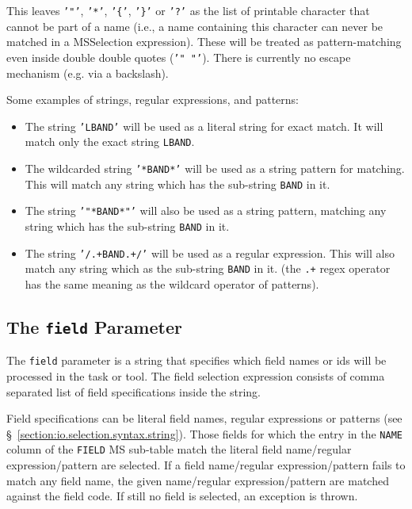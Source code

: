 This leaves  
{\tt '"'}, {\tt '*'}, {\tt'\{'}, {\tt '\}'} or {\tt '?'}
as the list of printable character that cannot be part of a name
(i.e., a name containing this character can never be matched in a
MSSelection expression).  These will be treated as pattern-matching
even inside double double quotes ({\tt '" "'}).
There is currently no escape mechanism (e.g. via a backslash).

Some examples of strings, regular expressions, and patterns:
\begin{itemize}

\item The string {\tt 'LBAND'} will be used as a literal string for
      exact match.  It will match only the exact string {\tt LBAND}.

\item The wildcarded string {\tt '*BAND*'} will be used as a string pattern 
      for matching. This will match any string which has the
      sub-string {\tt BAND} in it. 

\item The string {\tt '"*BAND*"'} will also be used as a string
      pattern, matching any string which has the sub-string {\tt BAND} in it. 

\item The string {\tt '/.+BAND.+/'} will be used as a regular
      expression. This will also match any string which as the 
      sub-string {\tt BAND} in it. (the {\tt .+} regex operator 
      has the same meaning as the {\tt *} wildcard operator of patterns). 

\end{itemize}

\subsection{The {\tt field} Parameter}
\label{section:io.selection.field}

The {\tt field} parameter is a string that specifies which field
names or ids will be processed in the task or tool.
The field selection expression consists of comma separated list of
field specifications inside the string.

Field specifications can be literal field names, regular expressions
or patterns (see \S~\ref{section:io.selection.syntax.string}).  
Those fields for which the entry in the {\tt NAME} column of
the {\tt FIELD} MS sub-table match the literal field name/regular
expression/pattern are selected.
If a field name/regular expression/pattern fails to match any field
name, the given name/regular expression/pattern are matched against
the field code.  If still no field is selected, an exception is thrown.

